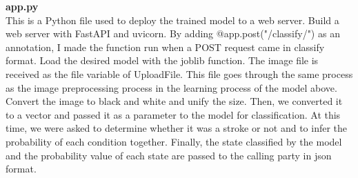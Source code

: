 \textbf{app.py} \\
This is a Python file used to deploy the trained model to a web server. Build a web server with FastAPI and uvicorn. By adding @app.post("/classify/") as an annotation, I made the function run when a POST request came in classify format. Load the desired model with the joblib function. The image file is received as the file variable of UploadFile. This file goes through the same process as the image preprocessing process in the learning process of the model above. Convert the image to black and white and unify the size. Then, we converted it to a vector and passed it as a parameter to the model for classification. At this time, we were asked to determine whether it was a stroke or not and to infer the probability of each condition together. Finally, the state classified by the model and the probability value of each state are passed to the calling party in json format.

